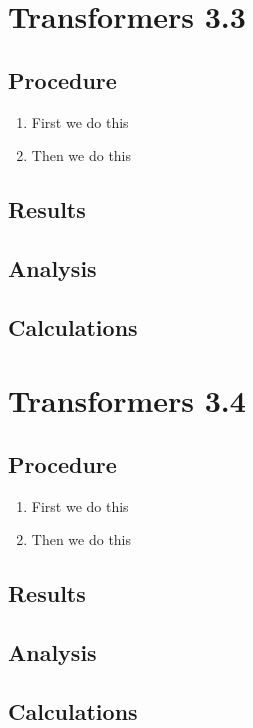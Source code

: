 \documentclass[12pt,letterpaper]{report}
\begin{document}
\section*{Transformers 3.3}
\subsection*{Procedure}

\begin{enumerate}
\item First we do this
\item Then we do this
\end{enumerate}

\subsection*{Results}

\subsection*{Analysis}

\subsection*{Calculations}

\section*{Transformers 3.4}
\subsection*{Procedure}

\begin{enumerate}
\item First we do this
\item Then we do this
\end{enumerate}

\subsection*{Results}

\subsection*{Analysis}

\subsection*{Calculations}
\end{document}
